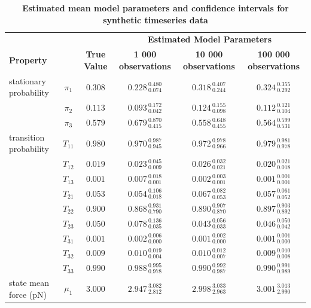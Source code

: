 \documentclass[aps,pre,twocolumn,superscriptaddress,nofootinbib,longbibliography]{revtex4-1}
\begin{document}
{\begin{table}
\caption{{\bf Estimated mean model parameters and confidence intervals for synthetic timeseries data}}
\label{table:synthetic-confidence-intervals}
\begin{tabular*}{\textwidth}{@{\extracolsep{\fill}}lccccc}
\hline
&  &  & \multicolumn{3}{c}{\bf Estimated Model Parameters}  \\ \cline{4-6}
\multicolumn{2}{l}{\bf Property} & \bf True Value & \bf 1 000 observations & \bf 10 000 observations & \bf 100 000 observations\\ \hline
stationary probability & $\pi_{1}$ & $0.308$ & $0.228_{\:0.074}^{\:0.480}$ & $0.318_{\:0.244}^{\:0.407}$ & $0.324_{\:0.292}^{\:0.355}$ \\
& $\pi_{2}$ & $0.113$ & $0.093_{\:0.042}^{\:0.172}$ & $0.124_{\:0.098}^{\:0.155}$ & $0.112_{\:0.104}^{\:0.121}$ \\
& $\pi_{3}$ & $0.579$ & $0.679_{\:0.415}^{\:0.870}$ & $0.558_{\:0.455}^{\:0.648}$ & $0.564_{\:0.531}^{\:0.599}$ \\
\hline
transition probability & $T_{11}$ & $0.980$ & $0.970_{\:0.945}^{\:0.987}$ & $0.972_{\:0.966}^{\:0.978}$ & $0.979_{\:0.978}^{\:0.981}$ \\
& $T_{12}$ & $0.019$ & $0.023_{\:0.009}^{\:0.045}$ & $0.026_{\:0.021}^{\:0.032}$ & $0.020_{\:0.018}^{\:0.021}$ \\
& $T_{13}$ & $0.001$ & $0.007_{\:0.001}^{\:0.018}$ & $0.002_{\:0.001}^{\:0.003}$ & $0.001_{\:0.001}^{\:0.001}$ \\
& $T_{21}$ & $0.053$ & $0.054_{\:0.018}^{\:0.106}$ & $0.067_{\:0.053}^{\:0.082}$ & $0.057_{\:0.052}^{\:0.061}$ \\
& $T_{22}$ & $0.900$ & $0.868_{\:0.790}^{\:0.931}$ & $0.890_{\:0.870}^{\:0.907}$ & $0.897_{\:0.892}^{\:0.903}$ \\
& $T_{23}$ & $0.050$ & $0.078_{\:0.035}^{\:0.136}$ & $0.043_{\:0.033}^{\:0.056}$ & $0.046_{\:0.042}^{\:0.050}$ \\
& $T_{31}$ & $0.001$ & $0.002_{\:0.000}^{\:0.006}$ & $0.001_{\:0.000}^{\:0.002}$ & $0.001_{\:0.000}^{\:0.001}$ \\
& $T_{32}$ & $0.009$ & $0.010_{\:0.004}^{\:0.019}$ & $0.010_{\:0.007}^{\:0.012}$ & $0.009_{\:0.008}^{\:0.010}$ \\
& $T_{33}$ & $0.990$ & $0.988_{\:0.978}^{\:0.995}$ & $0.990_{\:0.987}^{\:0.992}$ & $0.990_{\:0.989}^{\:0.991}$ \\
\hline
state mean force (pN) & $\mu_{1}$ & $3.000$ & $2.947_{\:2.812}^{\:3.082}$ & $2.998_{\:2.963}^{\:3.033}$ & $3.001_{\:2.990}^{\:3.013}$ \\

\end{tabular*}
\end{table}}
\end{document}
